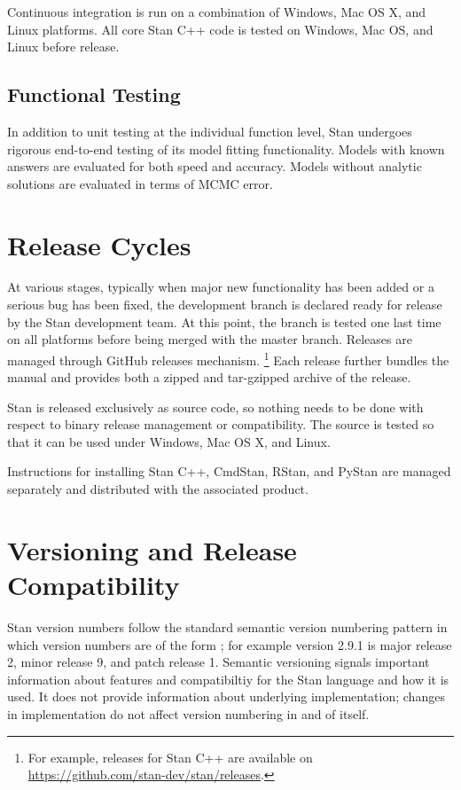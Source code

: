 Continuous integration is run on a combination of Windows, Mac OS X,
and Linux platforms.  All core Stan C++ code is tested on Windows, Mac
OS, and Linux before release.


\subsection{Functional Testing}

In addition to unit testing at the individual function level, Stan
undergoes rigorous end-to-end testing of its model fitting
functionality. Models with known answers are evaluated for both speed
and accuracy. Models without analytic solutions are evaluated in terms
of MCMC error.


\section{Release Cycles}

At various stages, typically when major new functionality has been
added or a serious bug has been fixed, the development branch is
declared ready for release by the Stan development team. At this
point, the branch is tested one last time on all platforms before
being merged with the master branch. Releases are managed through
GitHub releases mechanism.%
%
\footnote{For example, releases for Stan C++ are available on
\url{https://github.com/stan-dev/stan/releases}.}
%
Each release further bundles the manual and provides both a zipped and
tar-gzipped archive of the release.

Stan is released exclusively as source code, so nothing needs to be
done with respect to binary release management or compatibility.  The
source is tested so that it can be used under Windows, Mac OS X, and
Linux.

Instructions for installing Stan C++, CmdStan, RStan, and PyStan are
managed separately and distributed with the associated product.

\section{Versioning and Release Compatibility}\label{version-numbering.section}

Stan version numbers follow the standard semantic version numbering
pattern in which version numbers are of the form
; for example version 2.9.1 is major release
2, minor release 9, and patch release 1.  Semantic versioning signals
important information about features and compatibiltiy for the Stan
language and how it is used.   It does not provide information about
underlying implementation;  changes in implementation do not affect
version numbering in and of itself.

